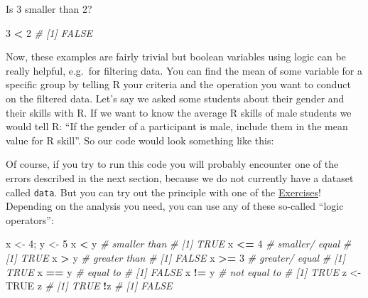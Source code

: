 \documentclass[
]{book}
\newenvironment{Shaded}{\begin{snugshade}}{\end{snugshade}}
\newcommand{\CommentTok}[1]{\textcolor[rgb]{0.56,0.35,0.01}{\textit{#1}}}
\newcommand{\ConstantTok}[1]{\textcolor[rgb]{0.56,0.35,0.01}{#1}}
\newcommand{\DecValTok}[1]{\textcolor[rgb]{0.00,0.00,0.81}{#1}}
\newcommand{\FunctionTok}[1]{\textcolor[rgb]{0.13,0.29,0.53}{\textbf{#1}}}
\newcommand{\NormalTok}[1]{#1}
\newcommand{\OtherTok}[1]{\textcolor[rgb]{0.56,0.35,0.01}{#1}}
\newcommand{\SpecialCharTok}[1]{\textcolor[rgb]{0.81,0.36,0.00}{\textbf{#1}}}
\newcommand{\StringTok}[1]{\textcolor[rgb]{0.31,0.60,0.02}{#1}}
\begin{document}
Is 3 smaller than 2?

\begin{Shaded}
\begin{Highlighting}[]
\DecValTok{3} \SpecialCharTok{\textless{}} \DecValTok{2}
\CommentTok{\# [1] FALSE}
\end{Highlighting}
\end{Shaded}

Now, these examples are fairly trivial but boolean variables using logic can be really helpful, e.g.~for filtering data.
You can find the mean of some variable for a specific group by telling R your criteria and the operation you want to conduct on the filtered data.
Let's say we asked some students about their gender and their skills with R.
If we want to know the average R skills of male students we would tell R: ``If the gender of a participant is male, include them in the mean value for R skill''.
So our code would look something like this:

\begin{Shaded}
\end{Shaded}

Of course, if you try to run this code you will probably encounter one of the errors described in the next section, because we do not currently have a dataset called \texttt{data}.
But you can try out the principle with one of the \hyperref[exercises]{Exercises}!
Depending on the analysis you need, you can use any of these so-called ``logic operators'':

\begin{Shaded}
\begin{Highlighting}[]
\NormalTok{x }\OtherTok{\textless{}{-}} \DecValTok{4}\NormalTok{; y }\OtherTok{\textless{}{-}} \DecValTok{5}
\NormalTok{x }\SpecialCharTok{\textless{}}\NormalTok{ y }\CommentTok{\# smaller than}
\CommentTok{\# [1] TRUE}
\NormalTok{x }\SpecialCharTok{\textless{}=} \DecValTok{4} \CommentTok{\# smaller/ equal}
\CommentTok{\# [1] TRUE}
\NormalTok{x }\SpecialCharTok{\textgreater{}}\NormalTok{ y }\CommentTok{\# greater than}
\CommentTok{\# [1] FALSE}
\NormalTok{x }\SpecialCharTok{\textgreater{}=} \DecValTok{3} \CommentTok{\# greater/ equal}
\CommentTok{\# [1] TRUE}
\NormalTok{x }\SpecialCharTok{==}\NormalTok{ y }\CommentTok{\# equal to}
\CommentTok{\# [1] FALSE}
\NormalTok{x }\SpecialCharTok{!=}\NormalTok{ y }\CommentTok{\# not equal to}
\CommentTok{\# [1] TRUE}
\NormalTok{z }\OtherTok{\textless{}{-}} \ConstantTok{TRUE}
\NormalTok{z}
\CommentTok{\# [1] TRUE}
\SpecialCharTok{!}\NormalTok{z}
\CommentTok{\# [1] FALSE}
\end{Highlighting}
\end{Shaded}
\end{document}

